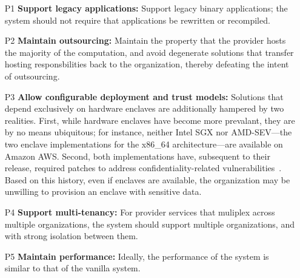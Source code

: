 \begin{enumerate}
    \item[P1] \textbf{Support legacy applications:} 
        Support legacy binary applications; the system should not require that
        applications be rewritten or recompiled.

    \item[P2] \textbf{Maintain outsourcing:}
        Maintain the property that the provider hosts the majority of the computation,
        and avoid degenerate solutions that transfer hosting responsbilities
        back to the organization, thereby defeating the intent of
        outsourcing.

    \item[P3] \textbf{Allow configurable deployment and trust models:}
        Solutions that depend exclusively on hardware enclaves are additionally
        hampered by two realities.
        First, while hardware enclaves have become more prevalant, they are by no means
        ubiquitous; for instance, neither Intel SGX nor AMD-SEV---the two enclave
        implementations for the x86\_64 architecture---are available on Amazon AWS\@.
        Second, both implementations have, subsequent to their release, required
        patches to address confidentiality-related vulnerabilities~\cite{foreshadow,
        amd-sev-unprotected-io, severed}.
        Based on this history, even if enclaves are available, the organization may be
        unwilling to provision an enclave with sensitive data.

    \item[P4] \textbf{Support multi-tenancy:} 
        For provider services that muliplex
        across multiple organizations, the system should support multiple
        organizations, and with strong isolation between them.

    \item[P5] \textbf{Maintain performance:}
        Ideally, the performance of the system is similar to that of the vanilla
        system.
\end{enumerate}
